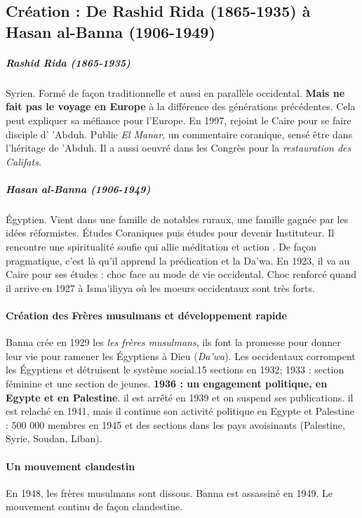 \subsection{Création : De Rashid Rida (1865-1935) à Hasan al-Banna (1906-1949)}

\subparagraph{Rashid Rida (1865-1935) } \label{Theol:Rida} Syrien. Formé de façon traditionnelle et aussi en parallèle occidental. \textbf{Mais ne fait pas le voyage en Europe} à la différence des générations précédentes. Cela peut expliquer sa méfiance pour l'Europe. En 1997, rejoint le Caire pour se faire disciple d' 'Abduh. Publie \emph{El Manar}, un commentaire coranique, sensé être dans l'héritage de 'Abduh. Il a aussi oeuvré dans les Congrès pour la \textit{restauration des Califats}.

\subparagraph{Hasan al-Banna (1906-1949)} Égyptien. Vient dans une famille de notables ruraux, une famille gagnée par les idées réformistes. Études Coraniques puis études pour devenir Instituteur. Il rencontre une spiritualité soufie qui allie méditation et action . De façon pragmatique, c'est là qu'il apprend la prédication et la Da'wa. En 1923, il va au Caire pour ses études : choc face au mode de vie occidental. Choc renforcé quand il arrive en 1927 à Isma'iliyya où les moeurs occidentaux sont très forts. 

\paragraph{Création des Frères musulmans et développement rapide} Banna crée en 1929 les \emph{les frères musulmans}, ils font la promesse pour donner leur vie pour ramener les Égyptiens à Dieu (\emph{Da'wa}). Les occidentaux corrompent les Égyptiens et détruisent le système social.15 sections en 1932; 1933 : section féminine et une section de jeunes. \textbf{1936 : un engagement politique, en Egypte et en Palestine}. il est arrêté en 1939 et on suspend ses publications. il est relaché en 1941, mais il continue son activité politique en Egypte et Palestine : 500 000 membres en 1945 et des sections dans les pays avoisinants (Palestine, Syrie, Soudan, Liban). 

\paragraph{Un mouvement clandestin} En 1948, les frères musulmans sont dissous. Banna est assassiné en 1949. Le mouvement continu de façon clandestine.

